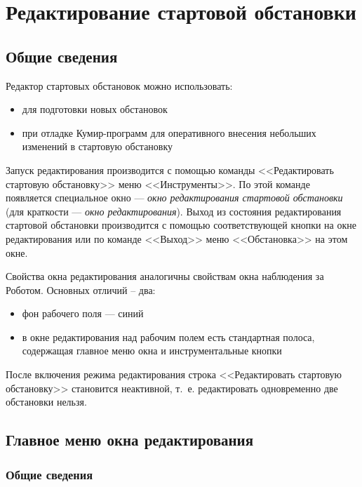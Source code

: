 \section{Редактирование стартовой обстановки}
\label{robotedit}

\subsection{Общие сведения}
\label{roboteditcommon}

Редактор стартовых обстановок можно использовать:
\begin{itemize}
\item для подготовки новых обстановок
\item при отладке Кумир-программ для оперативного внесения небольших изменений в стартовую обстановку
\end{itemize}

Запуск редактирования производится с помощью команды <<Редактировать стартовую обстановку>> меню <<Инструменты>>. По этой команде появляется специальное окно --- \emph{окно редактирования стартовой обстановки} (для краткости --- \emph{окно редактирования}). Выход из состояния редактирования стартовой обстановки производится с помощью соответствующей кнопки на окне редактирования  или по команде <<Выход>> меню <<Обстановка>> на этом окне.

Свойства окна редактирования аналогичны свойствам окна наблюдения за Роботом. Основных отличий – два:
\begin{itemize}
\item фон рабочего поля --- синий
\item в окне редактирования над рабочим полем есть стандартная полоса, содержащая главное меню окна и инструментальные кнопки
\end{itemize}

После включения режима редактирования строка <<Редактировать стартовую обстановку>> становится неактивной, т.~е. редактировать одновременно две обстановки нельзя. 

\subsection{Главное меню окна редактирования}
\label{robotmainmenu}

\subsubsection{Общие сведения}


